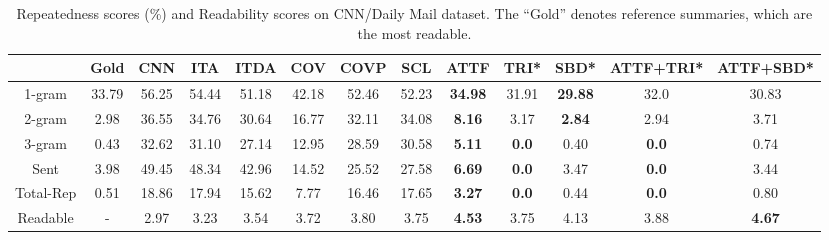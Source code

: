 \begin{table}[th!]
\scriptsize
\begin{center}
\caption{Repeatedness scores (\%) and Readability scores on CNN/Daily Mail dataset.
The ``Gold'' denotes reference summaries, which are the most readable.
} 
            \begin{tabular}{|c|c|ccccccc|cccc|}
                \hline
                    & Gold & CNN  & ITA & ITDA & COV & COVP & SCL & ATTF & TRI* & SBD* & ATTF+TRI* & ATTF+SBD* \\
                \hline
                1-gram & 33.79 & 56.25 & 54.44 & 51.18 & 42.18 & 52.46 & 52.23 & \bf 34.98 & 31.91 & \bf 29.88 & 32.0 & 30.83 \\
                2-gram & 2.98 & 36.55 & 34.76 & 30.64 & 16.77 & 32.11 & 34.08 & \bf 8.16 & 3.17 & \bf 2.84 & 2.94 & 3.71 \\
                3-gram & 0.43 & 32.62 & 31.10 & 27.14 & 12.95 & 28.59 & 30.58 & \bf 5.11 & \bf 0.0 & 0.40 & \bf 0.0 & 0.74 \\
                Sent & 3.98 & 49.45 & 48.34 & 42.96 & 14.52 & 25.52 & 27.58 & \bf 6.69 & \bf 0.0 & 3.47 & \bf 0.0 & 3.44 \\
                \hline
                Total-Rep & 0.51 & 18.86 & 17.94 & 15.62 & 7.77 & 16.46 & 17.65 & \bf 3.27 & \bf 0.0 & 0.44 & \bf 0.0 & 0.80 \\
                \hline
                Readable & - & 2.97 & 3.23 & 3.54 & 3.72 & 3.80 & 3.75 & \bf 4.53 & 3.75 & 4.13 & 3.88 & \bf 4.67 \\
                \hline
            \end{tabular}
\label{tab:eval_repe}
\end{center}
\end{table}


